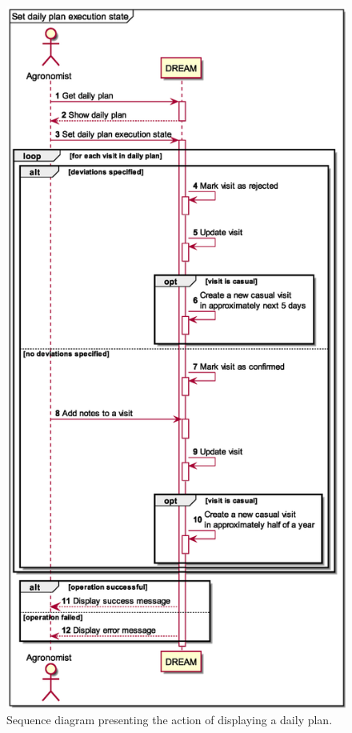 \begin{figure}[H]
    \centering
    \includegraphics[scale=0.6, keepaspectratio, height=0.98\textheight, origin=c]{diagrams/sequence/set_daily_plan_execution_state}
    \caption{Sequence diagram presenting the action of displaying a daily plan.}
    \label{fig:sd_set_daily_plan_execution_state}
\end{figure}

